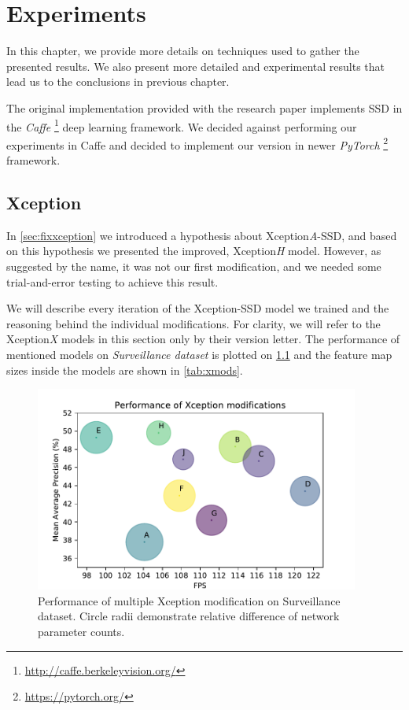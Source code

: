 \chapter{Experiments}
In this chapter, we provide more details on techniques used to gather the presented results. We also present more detailed and experimental results that lead us to the conclusions in previous chapter.

The original implementation provided with the research paper implements SSD in the \textit{Caffe} \footnote{\url{http://caffe.berkeleyvision.org/}} deep learning framework. We decided against performing our experiments in Caffe and decided to implement our version in newer \textit{PyTorch} \footnote{\url{https://pytorch.org/}} framework. 


\section{Xception}
In \cref{sec:fixxception} we introduced a hypothesis about Xception\textit{A}-SSD, and based on this hypothesis we presented the improved, Xception\textit{H} model. However, as suggested by the name, it was not our first modification, and we needed some trial-and-error testing to achieve this result.

We will describe every iteration of the Xception-SSD model we trained and the reasoning behind the individual modifications. For clarity, we will refer to the Xception\textit{X} models in this section only by their version letter. The performance of mentioned models on \textit{Surveillance dataset} is plotted on \cref{fig:xception_perf} and the feature map sizes inside the models are shown in \cref{tab:xmods}.


\begin{figure}
    \centering
    \includegraphics[width=0.95\textwidth]{img/fps_map_x}
    \caption[Performance of multiple Xception modification on Surveillance dataset]{Performance of multiple Xception modification on Surveillance dataset. Circle radii demonstrate relative difference of network parameter counts.} 
    \label{fig:xception_perf}
\end{figure}

